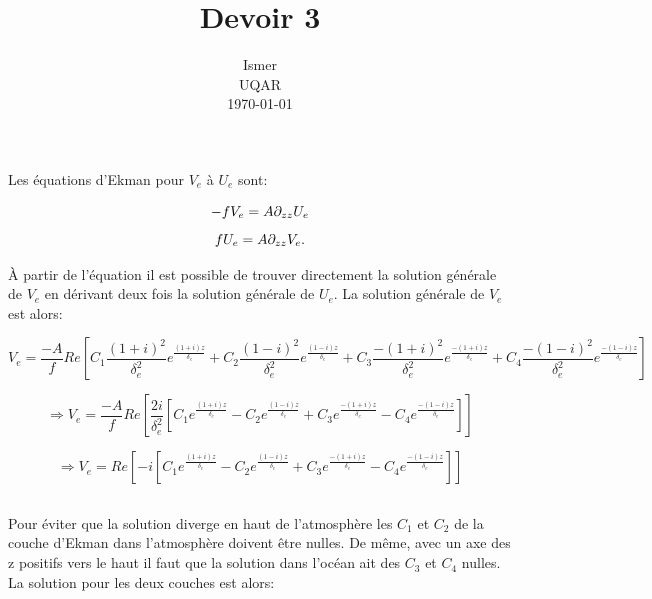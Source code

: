 \documentclass[11pt,a4paper,titlepage]{article}
\begin{document}
\author{\jf}
\title{Devoir 3}
\date{Ismer \\ UQAR \\ \today}
\onehalfspacing
\setlength{\parindent}{0cm}
\renewcommand\thesection{\arabic{section}}
\renewcommand\thesubsection{\thesection.\arabic{subsection}}

\maketitlepage

\blankpage

\section{}

Les équations d'Ekman pour $V_e$ à $U_e$ sont:

\begin{equation}
-f V_e = A \partial_{zz} U_e
 \label{1}
\end{equation}
\begin{equation}
f U_e = A \partial_{zz} V_e.
\end{equation}

À partir de l'équation \label{1} il est possible de trouver directement la solution générale de $V_e$ en dérivant deux fois la solution générale de $U_e$. La solution générale de $V_e$ est alors:

\begin{equation}
V_e = \frac{-A}{f} Re \left[C_1 \frac{(1+i)^2}{\delta_e^2}e^{\frac{(1+i)z}{\delta_e}}+C_2 \frac{(1-i)^2}{\delta_e^2}e^{\frac{(1-i)z}{\delta_e}}+C_3 \frac{-(1+i)^2}{\delta_e^2}e^{\frac{-(1+i)z}{\delta_e}}+C_4 \frac{-(1-i)^2}{\delta_e^2}e^{\frac{-(1-i)z}{\delta_e}}\right] \nonumber
\end{equation}

\begin{equation}
\Rightarrow V_e = \frac{-A}{f} Re \left[\frac{2i}{\delta_e^2}\left[ C_1 e^{\frac{(1+i)z}{\delta_e}}-C_2 e^{\frac{(1-i)z}{\delta_e}}+C_3 e^{\frac{-(1+i)z}{\delta_e}}-C_4 e^{\frac{-(1-i)z}{\delta_e}}\right]\right] \nonumber
\end{equation}

\begin{equation}
\Rightarrow V_e =  Re \left[-i \left[C_1 e^{\frac{(1+i)z}{\delta_e}}-C_2 e^{\frac{(1-i)z}{\delta_e}}+C_3 e^{\frac{-(1+i)z}{\delta_e}}-C_4 e^{\frac{-(1-i)z}{\delta_e}}\right]\right]
\end{equation}


\subsection{}
Pour éviter que la solution diverge en haut de l'atmosphère les $C_1$ et $C_2$ de la couche d'Ekman dans l'atmosphère doivent être nulles. De même, avec un axe des z positifs vers le haut il faut que la solution dans l'océan ait des $C_3$ et $C_4$ nulles.  La solution pour les deux couches est alors: 
\end{document}
